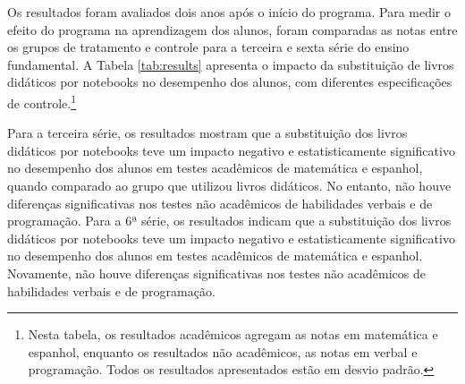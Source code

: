 \documentclass[12pt,letterpaper]{article}
\newcommand{\1}{\mathbbm{1}}
\numberwithin{equation}{section}
\begin{document}
Os resultados foram avaliados dois anos após o início do programa. Para medir o efeito do programa na aprendizagem dos alunos, foram comparadas as notas entre os grupos de tratamento e controle para a terceira e sexta série do ensino fundamental. A Tabela \ref{tab:results} apresenta o impacto da substituição de livros didáticos por notebooks no desempenho dos alunos, com diferentes especificações de controle.\footnote{Nesta tabela, os resultados acadêmicos agregam as notas em matemática e espanhol, enquanto os resultados não acadêmicos, as notas em verbal e programação. Todos os resultados apresentados estão em desvio padrão.}

Para a terceira série, os resultados mostram que a substituição dos livros didáticos por notebooks teve um impacto negativo e estatisticamente significativo no desempenho dos alunos em testes acadêmicos de matemática e espanhol, quando comparado ao grupo que utilizou livros didáticos. No entanto, não houve diferenças significativas nos testes não acadêmicos de habilidades verbais e de programação. Para a 6ª série, os resultados indicam que a substituição dos livros didáticos por notebooks teve um impacto negativo e estatisticamente significativo no desempenho dos alunos em testes acadêmicos de matemática e espanhol. Novamente, não houve diferenças significativas nos testes não acadêmicos de habilidades verbais e de programação. 
\end{document}
